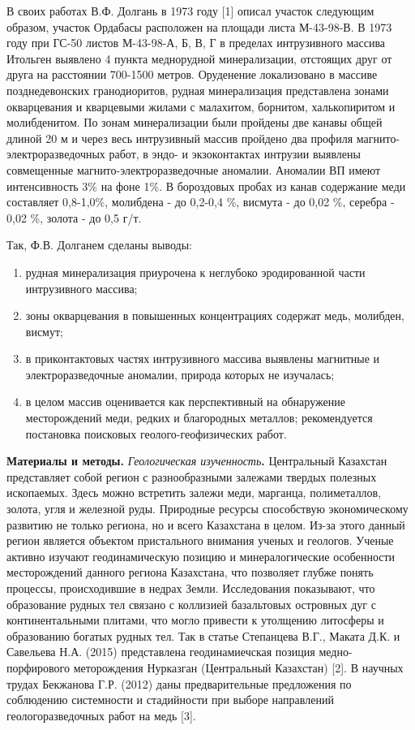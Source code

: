 В своих работах В.Ф. Долгань в 1973 году {[}1{]} описал участок
следующим образом, участок Ордабасы расположен на площади листа
М-43-98-В. В 1973 году при ГС-50 листов М-43-98-А, Б, В, Г в пределах
интрузивного массива Итольген выявлено 4 пункта меднорудной
минерализации, отстоящих друг от друга на расстоянии 700-1500 метров.
Оруденение локализовано в массиве позднедевонских гранодиоритов, рудная
минерализация представлена зонами окварцевания и кварцевыми жилами с
малахитом, борнитом, халькопиритом и молибденитом. По зонам
минерализации были пройдены две канавы общей длиной 20 м и через весь
интрузивный массив пройдено два профиля магнито-электроразведочных
работ, в эндо- и экзоконтактах интрузии выявлены совмещенные
магнито-электроразведочные аномалии. Аномалии ВП имеют интенсивность 3\%
на фоне 1\%. В бороздовых пробах из канав содержание меди составляет
0,8-1,0\%, молибдена - до 0,2-0,4 \%, висмута - до 0,02 \%, серебра -
0,02 \%, золота - до 0,5 г/т.

Так, Ф.В. Долганем сделаны выводы:

\begin{enumerate}
\def\labelenumi{\alph{enumi})}
\item
  рудная минерализация приурочена к неглубоко эродированной части
  интрузивного массива;
\item
  зоны окварцевания в повышенных концентрациях содержат медь, молибден,
  висмут;
\item
  в приконтактовых частях интрузивного массива выявлены магнитные и
  электроразведочные аномалии, природа которых не изучалась;
\item
  в целом массив оценивается как перспективный на обнаружение
  месторождений меди, редких и благородных металлов; рекомендуется
  постановка поисковых геолого-геофизических работ.
\end{enumerate}

{\bfseries Материалы и методы.} \emph{Геологическая изученность}{\bfseries .}
Центральный Казахстан представляет собой регион с разнообразными
залежами твердых полезных ископаемых. Здесь можно встретить залежи меди,
марганца, полиметаллов, золота, угля и железной руды. Природные ресурсы
способствую экономическому развитию не только региона, но и всего
Казахстана в целом. Из-за этого данный регион является объектом
пристального внимания ученых и геологов. Ученые активно изучают
геодинамическую позицию и минералогические особенности месторождений
данного региона Казахстана, что позволяет глубже понять процессы,
происходившие в недрах Земли. Исследования показывают, что образование
рудных тел связано с коллизией базальтовых островных дуг с
континентальными плитами, что могло привести к утолщению литосферы и
образованию богатых рудных тел. Так в статье Степанцева В.Г., Маката
Д.К. и Савельева Н.А. (2015) представлена геодинамиечская позиция
медно-порфирового меторождения Нурказган (Центральный Казахстан)
{[}2{]}. В научных трудах Бекжанова Г.Р. (2012) даны предварительные
предложения по соблюдению системности и стадийности при выборе
направлений геологоразведочных работ на медь {[}3{]}.

